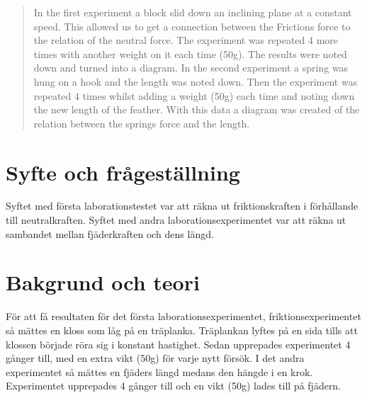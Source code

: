 \documentclass[11p, titlepage, oneside, a4paper]{article}
\begin{document}
    \begin{otherlanguage}{english}
        \begin{abstract}
             In the first experiment a block slid down an inclining plane at a constant speed. This allowed us to get a connection between the Frictions force to the relation of the neutral force. The experiment was repeated 4 more times with another weight on it each time (50g). The results were noted down and turned into a diagram.
            In the second experiment a spring was hung on a hook and the length was noted down. Then the experiment was repeated 4 times whilst adding a weight (50g) each time and noting down the new length of the feather. With this data a diagram was created of the relation between the springs force and the length.
        \end{abstract}
    \end{otherlanguage}
    \tableofcontents

    \newpage


    \setlength{\parindent}{0pt}
    \setlength{\parskip}{10pt}

    \section{Syfte och frågeställning}
    Syftet med första laborationstestet var att räkna ut friktionskraften i förhållande till neutralkraften. Syftet med andra laborationsexperimentet var att räkna ut sambandet mellan fjäderkraften och dens längd.

    \section{Bakgrund och teori}
    För att få resultaten för det första laborationsexperimentet, friktionsexperimentet så mättes en kloss som låg på en träplanka. Träplankan lyftes på en sida tills att klossen började röra sig i konstant hastighet. Sedan upprepades experimentet 4 gånger till, med en extra vikt (50g) för varje nytt försök.
    I det andra experimentet så mättes en fjäders längd medans den hängde i en krok. Experimentet upprepades 4 gånger till och en vikt (50g) lades till på fjädern.
\end{document}
